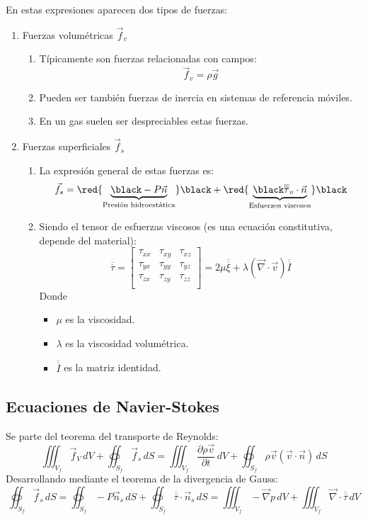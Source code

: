 En estas expresiones aparecen dos tipos de fuerzas:
\begin{enumerate}
	\item Fuerzas volumétricas $\vec{f}_v$
	\begin{enumerate}
		\item Típicamente son fuerzas relacionadas con campos:
		\[\vec{f}_v=\rho \vec{g}\]
		\item Pueden ser también fuerzas de inercia en sistemas de referencia móviles.
		\item En un gas suelen ser despreciables estas fuerzas.
	\end{enumerate}
	\item Fuerzas superficiales $\vec{f}_s$
	
	\begin{enumerate}
		\item La expresión general de estas fuerzas es:
		\[\vec{f}_s=
		\red{\underbrace{\black -P\vec{n}}_{\text{Presión hidroestática}}}\black
		+
		\red{\underbrace{\black \overline{\overline{\tau}}_v\cdot\vec{n}}_{\text{Esfuerzos viscosos}}}\black
		\]
		\item Siendo el tensor de esfuerzas viscosos (es una ecuación constitutiva, depende del material):
		\[
		\overline{\overline{\tau}}=
		\begin{bmatrix}
			\tau_{xx} &\tau_{xy} & \tau_{xz} \\
			 \tau_{yx}&  \tau_{yy}& \tau_{yz}\\	
			\tau_{zx} & \tau_{zy} & \tau_{zz} \\
		\end{bmatrix}
		=2\mu \overline{\overline{\xi}} + \lambda \left(\vec{\nabla}\cdot \vec{v}\right)\overline{\overline{I}}
		\]
		Donde \begin{itemize}
			\item $\mu$ es la viscosidad.
			\item $\lambda$ es la viscosidad volumétrica.
			\item $\overline{\overline{I}}$ es la matriz identidad.
		\end{itemize}
	\end{enumerate}
\end{enumerate}
\subsection{Ecuaciones de Navier-Stokes}
Se parte del teorema del transporte de Reynolds:
\begin{equation}
\iiint_{V_f}\vec{f}_V\,dV
+
\oiint_{S_f}\vec{f}_s\,dS
=
\iiint_{V_f}\frac{\partial \rho\vec{v}}{\partial t}\,dV
+
\oiint_{S_f}\rho\vec{v}\left(\vec{v}\cdot\vec{n}\right)\,dS
\end{equation}
Desarrollando mediante el teorema de la divergencia de Gauss:
\begin{equation}
	\oiint_{S_f}\vec{f}_s\,dS
	=
	\oiint_{S_f}-P\vec{n}_s\,dS
	+
	\oiint_{S_f}\overline{\overline{\tau}}\cdot\vec{n}_s\,dS
	=
	\iiint_{V_f}-\vec{\nabla}p\,dV
	+
	\iiint_{V_f}\vec{\nabla}\cdot\overline{\overline{\tau}}\,dV
\end{equation}

